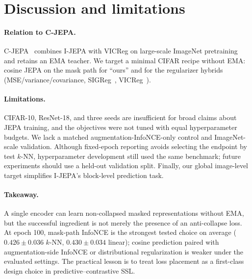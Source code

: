 \documentclass[11pt,twocolumn]{article}
\begin{document}
\section{Discussion and limitations}
\label{sec:discussion}

\paragraph{Relation to C-JEPA.}
C-JEPA~\citep{mo2024cjepa} combines I-JEPA with VICReg on large-scale ImageNet
pretraining and retains an EMA teacher.
We target a minimal CIFAR recipe without EMA: cosine JEPA on the mask path for
``ours'' and for the regularizer hybrids
(MSE/variance/covariance, SIGReg~\citep{balestriero2025lejepa},
VICReg~\citep{bardes2022vicreg}).

\paragraph{Limitations.}
CIFAR-10, ResNet-18, and three seeds are insufficient for broad claims about
JEPA training, and the objectives were not tuned with equal hyperparameter
budgets. We lack a matched augmentation-InfoNCE-only control and ImageNet-scale
validation. Although fixed-epoch reporting avoids selecting the endpoint by
test $k$-NN, hyperparameter development still used the same benchmark; future
experiments should use a held-out validation split. Finally, our global
image-level target simplifies I-JEPA's block-level prediction task.

\paragraph{Takeaway.}
A single encoder can learn non-collapsed masked representations without EMA,
but the successful ingredient is not merely the presence of an anti-collapse
loss. At epoch 100, mask-path InfoNCE is the strongest tested choice on average
($0.426\mathbin{\pm}0.036$ $k$-NN, $0.430\mathbin{\pm}0.034$ linear); cosine
prediction paired with augmentation-side InfoNCE or distributional
regularization is weaker under the evaluated settings. The practical lesson is
to treat loss placement as a first-class design choice in predictive--contrastive SSL.



\end{document}
